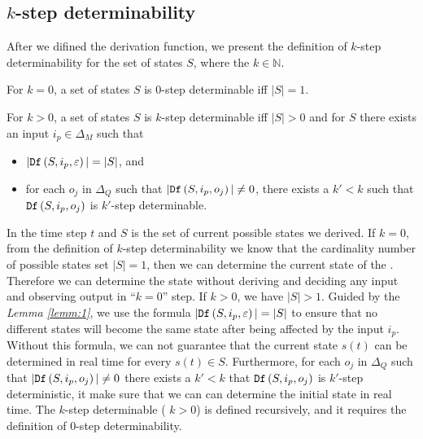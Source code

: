 \subsection{$k$-step determinability}
After we difined the derivation function, we present the definition of $k$-step determinability for the set of states $S$, where the $k\in \mathbb{N}$.%
\begin{definition} 

For $k=0$, a set of states $S$ is $0$-step determinable iff $|S|=1$. 

For $k>0$, a set of states $S$ is $k$-step determinable
 iff $|S|>0$ and for $S$ there exists an input $i_p \in \Delta_M$ such that
 \begin{itemize}
 \item  $|{\tt Df}\left(S,i_p,\varepsilon\right)|=|S|$, and 
 \item  for each $o_j$ in $\Delta_Q$ such that $|{\tt Df}\left(S,i_p,o_j\right)|\neq 0$, there exists a ${k'}<k$ such that ${\tt Df}\left(S,i_p,o_j\right)$ is $k'$-step determinable.
 \end{itemize}
\end{definition}

 In the time step $t$ and $S$ is the set of current possible states we derived. If $k=0$, from the definition of {\em$k$}-step determinability we know that the cardinality number of possible states set  $|S|=1$, then we can determine the current state of the \BCN. Therefore we can determine the state without deriving and deciding any input and observing output in ``$k=0$'' step. If $k>0$, we have $|S|>1$. Guided by the {\em Lemma \ref{lemm:1}}, we use the formula $|{\tt Df}\left(S,i_p,\varepsilon\right)|=|S|$ to ensure that no different states will become the same state after being affected by the input $i_p$. Without this formula, we can not guarantee that the current state $s(t)$ can be determined in real time for every $s(t)\in S$. Furthermore, for each $o_j$ in $\Delta_Q$ such that $|{\tt Df}\left(S,i_p,o_j\right)|\neq 0$ there exists a ${k'}<k$ that ${\tt Df}\left(S,i_p,o_j\right)$ is $k'$-step deterministic, it make sure that we can can determine the initial state in real time. The $k$-step determinable ( $k>0$) is defined recursively, and it requires the definition of $0$-step determinability.

